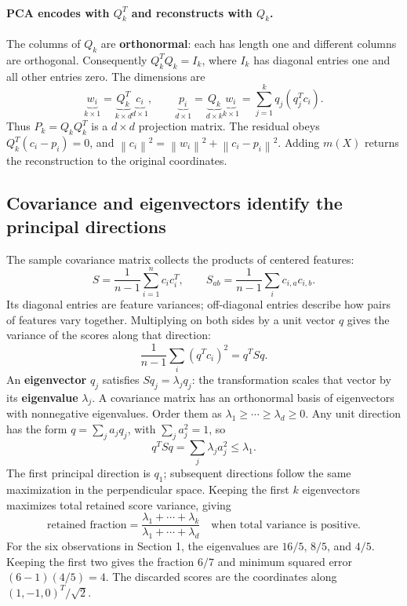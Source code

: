 \documentclass[11pt]{article}
\newcommand{\norm}[1]{\left\lVert#1\right\rVert}
\begin{document}
\paragraph{PCA encodes with $Q_k^T$ and reconstructs with $Q_k$.}
The columns of $Q_k$ are \textbf{orthonormal}: each has length one and
different columns are orthogonal. Consequently $Q_k^TQ_k=I_k$, where
$I_k$ has diagonal entries one and all other entries zero. The dimensions are
\[
 \underbrace{w_i}_{k\times1}=
 \underbrace{Q_k^T}_{k\times d}\underbrace{c_i}_{d\times1},\qquad
 \underbrace{p_i}_{d\times1}=\underbrace{Q_k}_{d\times k}
 \underbrace{w_i}_{k\times1}
 =\sum_{j=1}^k q_j(q_j^Tc_i).
\]
Thus $P_k=Q_kQ_k^T$ is a $d\times d$ projection matrix.
The residual obeys $Q_k^T(c_i-p_i)=0$, and
$\norm{c_i}^2=\norm{w_i}^2+\norm{c_i-p_i}^2$.
Adding $m(X)$ returns the reconstruction to the original coordinates.

\subsection{Covariance and eigenvectors identify the principal directions}
The sample covariance matrix collects the products of centered features:
\[
 S=\frac1{n-1}\sum_{i=1}^n c_ic_i^T,\qquad
 S_{ab}=\frac1{n-1}\sum_i c_{i,a}c_{i,b}.
\]
Its diagonal entries are feature variances; off-diagonal entries describe
how pairs of features vary together. Multiplying on both sides by a unit
vector $q$ gives the variance of the scores along that direction:
\[
 \frac1{n-1}\sum_i(q^Tc_i)^2=q^TSq.
\]
An \textbf{eigenvector} $q_j$ satisfies $Sq_j=\lambda_jq_j$:
the transformation scales that vector by its \textbf{eigenvalue}
$\lambda_j$. A covariance matrix has an orthonormal basis of eigenvectors
with nonnegative eigenvalues. Order them as
$\lambda_1\geq\cdots\geq\lambda_d\geq0$.
Any unit direction has the form $q=\sum_j a_jq_j$, with $\sum_j a_j^2=1$, so
\[
 q^TSq=\sum_j\lambda_j a_j^2\leq\lambda_1.
\]
The first principal direction is $q_1$; subsequent directions follow the
same maximization in the perpendicular space. Keeping the first $k$
eigenvectors maximizes total retained score variance, giving
\[
 \boxed{\text{retained fraction}=
 \frac{\lambda_1+\cdots+\lambda_k}{\lambda_1+\cdots+\lambda_d}}
 \quad\text{when total variance is positive.}
\]
For the six observations in Section 1, the eigenvalues are $16/5$, $8/5$,
and $4/5$. Keeping the first two gives the fraction $6/7$ and minimum
squared error $(6-1)(4/5)=4$. The discarded scores are the coordinates
along $(1,-1,0)^T/\sqrt2$.
\end{document}
